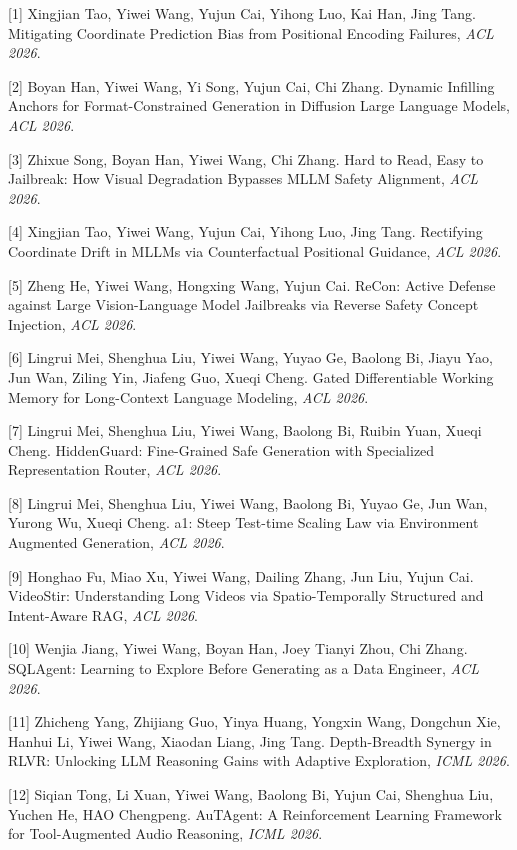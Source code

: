 [1] Xingjian Tao, Yiwei Wang, Yujun Cai, Yihong Luo, Kai Han, Jing Tang. Mitigating Coordinate Prediction Bias from Positional Encoding Failures, \textit{ACL 2026}.

[2] Boyan Han, Yiwei Wang, Yi Song, Yujun Cai, Chi Zhang. Dynamic Infilling Anchors for Format-Constrained Generation in Diffusion Large Language Models, \textit{ACL 2026}.

[3] Zhixue Song, Boyan Han, Yiwei Wang, Chi Zhang. Hard to Read, Easy to Jailbreak: How Visual Degradation Bypasses MLLM Safety Alignment, \textit{ACL 2026}.

[4] Xingjian Tao, Yiwei Wang, Yujun Cai, Yihong Luo, Jing Tang. Rectifying Coordinate Drift in MLLMs via Counterfactual Positional Guidance, \textit{ACL 2026}.

[5] Zheng He, Yiwei Wang, Hongxing Wang, Yujun Cai. ReCon: Active Defense against Large Vision-Language Model Jailbreaks via Reverse Safety Concept Injection, \textit{ACL 2026}.

[6] Lingrui Mei, Shenghua Liu, Yiwei Wang, Yuyao Ge, Baolong Bi, Jiayu Yao, Jun Wan, Ziling Yin, Jiafeng Guo, Xueqi Cheng. Gated Differentiable Working Memory for Long-Context Language Modeling, \textit{ACL 2026}.

[7] Lingrui Mei, Shenghua Liu, Yiwei Wang, Baolong Bi, Ruibin Yuan, Xueqi Cheng. HiddenGuard: Fine-Grained Safe Generation with Specialized Representation Router, \textit{ACL 2026}.

[8] Lingrui Mei, Shenghua Liu, Yiwei Wang, Baolong Bi, Yuyao Ge, Jun Wan, Yurong Wu, Xueqi Cheng. a1: Steep Test-time Scaling Law via Environment Augmented Generation, \textit{ACL 2026}.

[9] Honghao Fu, Miao Xu, Yiwei Wang, Dailing Zhang, Jun Liu, Yujun Cai. VideoStir: Understanding Long Videos via Spatio-Temporally Structured and Intent-Aware RAG, \textit{ACL 2026}.

[10] Wenjia Jiang, Yiwei Wang, Boyan Han, Joey Tianyi Zhou, Chi Zhang. SQLAgent: Learning to Explore Before Generating as a Data Engineer, \textit{ACL 2026}.

[11] Zhicheng Yang, Zhijiang Guo, Yinya Huang, Yongxin Wang, Dongchun Xie, Hanhui Li, Yiwei Wang, Xiaodan Liang, Jing Tang. Depth-Breadth Synergy in RLVR: Unlocking LLM Reasoning Gains with Adaptive Exploration, \textit{ICML 2026}.

[12] Siqian Tong, Li Xuan, Yiwei Wang, Baolong Bi, Yujun Cai, Shenghua Liu, Yuchen He, HAO Chengpeng. AuTAgent: A Reinforcement Learning Framework for Tool-Augmented Audio Reasoning, \textit{ICML 2026}.

